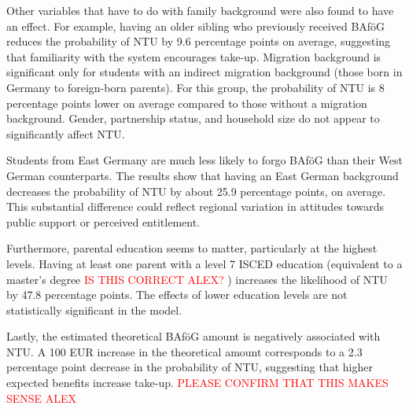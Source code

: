 Other variables that have to do with family background were also found to have an effect. For example, having an older sibling who previously received BAföG reduces the probability of NTU by 9.6 percentage points on average, suggesting that familiarity with the system encourages take-up. Migration background is significant only for students with an indirect migration background (those born in Germany to foreign-born parents). For this group, the probability of NTU is 8 percentage points lower on average compared to those without a migration background.  Gender, partnership status, and household size do not appear to significantly affect NTU.

Students from East Germany are much less likely to forgo BAföG than their West German counterparts. The results show that having an East German background decreases the probability of NTU by about 25.9 percentage points, on average. This substantial difference could reflect regional variation in attitudes towards public support or perceived entitlement.

Furthermore, parental education seems to matter, particularly at the highest levels. Having at least one parent with a level 7 ISCED education (equivalent to a master’s degree \textcolor{red}{IS THIS CORRECT ALEX?}
) increases the likelihood of NTU by 47.8 percentage points. The effects of lower education levels are not statistically significant in the model.

Lastly, the estimated theoretical BAföG amount is negatively associated with NTU. A 100 EUR increase in the theoretical amount corresponds to a 2.3 percentage point decrease in the probability of NTU, suggesting that higher expected benefits increase take-up. \textcolor{red}{PLEASE CONFIRM THAT THIS MAKES SENSE ALEX}


